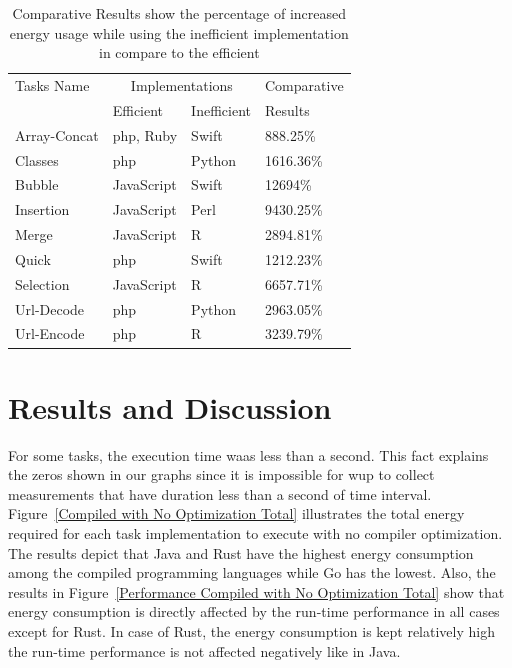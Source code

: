 \begin{table}
	\begin{threeparttable}
		\caption{Comparative Results show the percentage of increased energy usage while using the inefficient implementation in compare to the efficient}
		\label{Interpreted Energy Results}
		\begin{tabular}{llll}
			\toprule
			Tasks Name	& \multicolumn{2}{c}{Implementations} & Comparative\\
						& Efficient	& Inefficient	& Results\\
			\midrule
			Array-Concat& {\sc php}, Ruby	& Swift			& 888.25\% \\
			Classes		& {\sc php}		& Python		& 1616.36\% \\
			Bubble		& JavaScript& Swift			& 12694\% \\
			Insertion	& JavaScript& Perl			& 9430.25\% \\
			Merge		& JavaScript& R 			& 2894.81\% \\
			Quick 		& {\sc php}		& Swift			& 1212.23\% \\
			Selection	& JavaScript& R				& 6657.71\% \\
			Url-Decode	& {\sc php}		& Python		& 2963.05\% \\
			Url-Encode	& {\sc php}		& R				& 3239.79\% \\
			\bottomrule
		\end{tabular}
	\end{threeparttable}
\end{table}


\section{Results and Discussion} \label{results_and_discussion}
For some tasks, the execution time waas less than a second. This 
fact explains the zeros shown in our graphs since it is impossible 
for {\sc wup} to collect measurements that have duration less 
than a second of time interval.
Figure~\ref{Compiled with No Optimization Total} illustrates 
the total energy required for each task implementation to execute 
with no compiler optimization.
The results depict that Java and Rust have the highest 
energy consumption among the compiled programming languages while 
Go has the lowest.  
Also, the results in Figure~\ref{Performance Compiled with No Optimization Total} 
show that energy consumption is directly affected by the run-time 
performance in all cases except for Rust. 
In case of Rust, the energy consumption is kept relatively high 
the run-time performance is not affected negatively like in 
Java.


